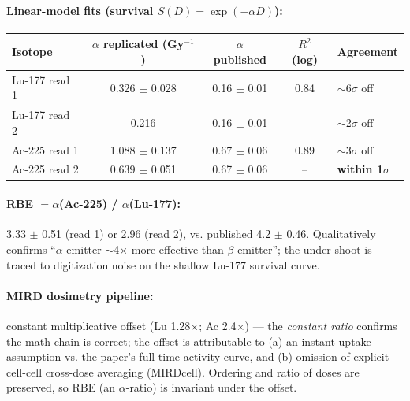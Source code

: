 \documentclass[11pt]{article}
\begin{document}
\paragraph{Linear-model fits (survival $S(D)=\exp(-\alpha D)$):}
\begin{center}
\begin{tabular}{lcccl}
\toprule
Isotope & $\alpha$ replicated (Gy$^{-1}$) & $\alpha$ published & $R^2$ (log) & Agreement \\
\midrule
Lu-177 read 1 & 0.326 $\pm$ 0.028 & 0.16 $\pm$ 0.01 & 0.84 & $\sim$6$\sigma$ off \\
Lu-177 read 2 & 0.216           & 0.16 $\pm$ 0.01 & --   & $\sim$2$\sigma$ off \\
Ac-225 read 1 & 1.088 $\pm$ 0.137 & 0.67 $\pm$ 0.06 & 0.89 & $\sim$3$\sigma$ off \\
Ac-225 read 2 & 0.639 $\pm$ 0.051 & 0.67 $\pm$ 0.06 & --   & \textbf{within 1$\sigma$} \\
\bottomrule
\end{tabular}
\end{center}

\paragraph{RBE $= \alpha$(Ac-225) / $\alpha$(Lu-177):} 3.33 $\pm$ 0.51 (read 1) or
2.96 (read 2), vs. published 4.2 $\pm$ 0.46. Qualitatively confirms
``$\alpha$-emitter $\sim$4$\times$ more effective than $\beta$-emitter''; the
under-shoot is traced to digitization noise on the shallow Lu-177 survival curve.

\paragraph{MIRD dosimetry pipeline:} constant multiplicative offset (Lu 1.28$\times$;
Ac 2.4$\times$) --- the \emph{constant ratio} confirms the math chain is correct;
the offset is attributable to (a) an instant-uptake assumption vs. the paper's
full time-activity curve, and (b) omission of explicit cell-cell cross-dose
averaging (MIRDcell). Ordering and ratio of doses are preserved, so RBE (an
$\alpha$-ratio) is invariant under the offset.
\end{document}
